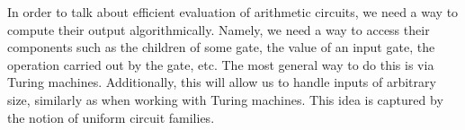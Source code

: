 %
%

In order to talk about efficient evaluation of arithmetic circuits, we need a way to compute their output algorithmically. Namely, we need a way to access their components such as the children of some gate, the value of an input gate, the operation  carried out by the gate, etc. The most general way to do this is via Turing machines. Additionally, this will allow us to handle inputs of arbitrary size, similarly as when working with Turing machines. This idea is captured by the notion of uniform circuit families. 

